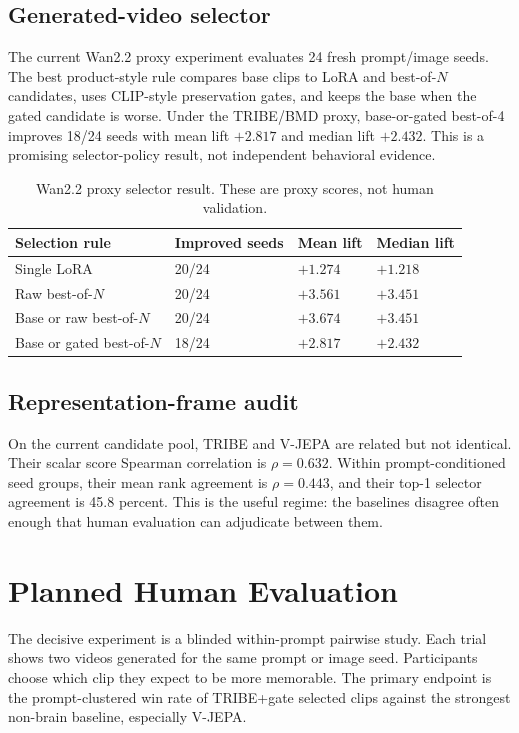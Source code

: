 \documentclass[11pt]{article}
\begin{document}
\subsection{Generated-video selector}

The current Wan2.2 proxy experiment evaluates 24 fresh prompt/image seeds. The
best product-style rule compares base clips to LoRA and best-of-$N$ candidates,
uses CLIP-style preservation gates, and keeps the base when the gated candidate
is worse. Under the TRIBE/BMD proxy, base-or-gated best-of-4 improves 18/24
seeds with mean lift $+2.817$ and median lift $+2.432$. This is a promising
selector-policy result, not independent behavioral evidence.

\begin{table}[h]
\centering
\caption{Wan2.2 proxy selector result. These are proxy scores, not human
validation.}
\begin{tabular}{llll}
\toprule
Selection rule & Improved seeds & Mean lift & Median lift \\
\midrule
Single LoRA & 20/24 & $+1.274$ & $+1.218$ \\
Raw best-of-$N$ & 20/24 & $+3.561$ & $+3.451$ \\
Base or raw best-of-$N$ & 20/24 & $+3.674$ & $+3.451$ \\
Base or gated best-of-$N$ & 18/24 & $+2.817$ & $+2.432$ \\
\bottomrule
\end{tabular}
\end{table}

\subsection{Representation-frame audit}

On the current candidate pool, TRIBE and V-JEPA are related but not identical.
Their scalar score Spearman correlation is $\rho=0.632$. Within
prompt-conditioned seed groups, their mean rank agreement is $\rho=0.443$, and
their top-1 selector agreement is 45.8 percent. This is the useful regime:
the baselines disagree often enough that human evaluation can adjudicate between
them.

\section{Planned Human Evaluation}

The decisive experiment is a blinded within-prompt pairwise study. Each trial
shows two videos generated for the same prompt or image seed. Participants choose
which clip they expect to be more memorable. The primary endpoint is the
prompt-clustered win rate of TRIBE+gate selected clips against the strongest
non-brain baseline, especially V-JEPA.
\end{document}
